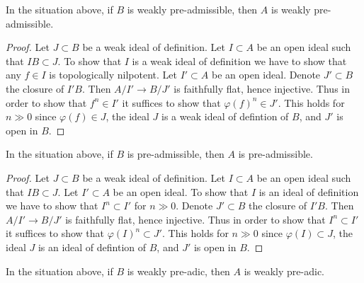 \begin{lemma}
\label{lemma-taut-descent-weakly-admissible}
In the situation above, if $B$ is weakly pre-admissible, then
$A$ is weakly pre-admissible.
\end{lemma}

\begin{proof}
Let $J \subset B$ be a weak ideal of definition. Let $I \subset A$
be an open ideal such that $IB \subset J$. To show that $I$ is a weak ideal
of definition we have to show that any $f \in I$ is topologically nilpotent.
Let $I' \subset A$ be an open ideal. Denote $J' \subset B$ the closure
of $I'B$. Then $A/I' \to B/J'$ is faithfully flat, hence injective.
Thus in order to show that $f^n \in I'$ it suffices to show
that $\varphi(f)^n \in J'$. This holds for $n \gg 0$ since
$\varphi(f) \in J$, the ideal $J$ is a weak ideal of defintion of $B$,
and $J'$ is open in $B$.
\end{proof}

\begin{lemma}
\label{lemma-taut-descent-admissible}
In the situation above, if $B$ is pre-admissible, then $A$
is pre-admissible.
\end{lemma}

\begin{proof}
Let $J \subset B$ be a weak ideal of definition. Let $I \subset A$
be an open ideal such that $IB \subset J$. Let $I' \subset A$ be an open ideal.
To show that $I$ is an ideal of definition we have to show that
$I^n \subset I'$ for $n \gg 0$. Denote $J' \subset B$ the closure
of $I'B$. Then $A/I' \to B/J'$ is faithfully flat, hence injective.
Thus in order to show that $I^n \subset I'$ it suffices to show
that $\varphi(I)^n \subset J'$. This holds for $n \gg 0$ since
$\varphi(I) \subset J$, the ideal $J$ is an ideal of defintion of $B$,
and $J'$ is open in $B$.
\end{proof}

\begin{lemma}
\label{lemma-taut-descent-weakly-adic}
In the situation above, if $B$ is weakly pre-adic, then $A$
is weakly pre-adic.
\end{lemma}


